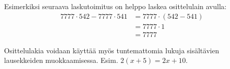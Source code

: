 Esimerkiksi seuraava laskutoimitus on helppo laskea osittelulain avulla: 
     \begin{align*}
	  7777\cdot 542-7777\cdot 541 &= 7777\cdot (542-541)  \\ &= 7777\cdot 1 \\ &= 7777
     \end{align*}


Osittelulakia voidaan käyttää myös tuntemattomia lukuja sisältävien lausekkeiden muokkaamisessa. Esim. $2(x+5)=2x+10$.

